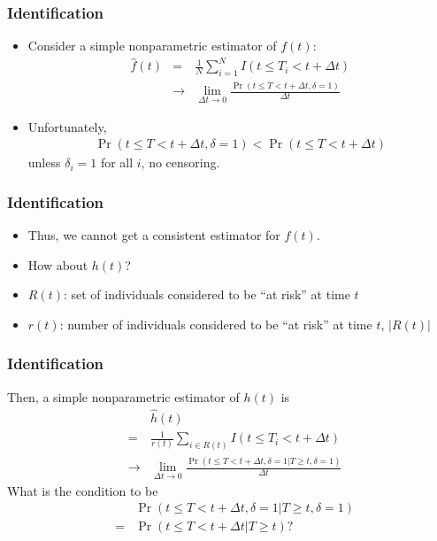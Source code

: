 \documentclass[14pt]{beamer}
\begin{document}
	\begin{frame}
	\frametitle{Identification}
	\begin{itemize}
	\item Consider a simple nonparametric estimator of $f(t)$:
	\begin{eqnarray*}
	\hat{f}(t) &=& \frac{1}{N} \sum_{i=1}^N I(t \leq T_i < t + \Delta t)\\
	&\to& \lim_{\Delta t \to 0}\frac{\Pr(t \leq T < t + \Delta t, \delta = 1)}{\Delta t}
	\end{eqnarray*}
	\item Unfortunately,
	\begin{eqnarray*}
	\Pr(t \leq T < t + \Delta t, \delta = 1) < \Pr(t \leq T < t + \Delta t)
	\end{eqnarray*}
	unless $\delta_i = 1$ for all $i$, no censoring.

	\end{itemize}
	\end{frame}

	\begin{frame}
	\frametitle{Identification}
	\begin{itemize}
	\item Thus, we cannot get a consistent estimator for $f(t)$.
	\item How about $h(t)$?
	\item $R(t)$: set of individuals considered to be ``at risk'' at time $t$
	\item $r(t)$: number of individuals considered to be ``at risk'' at time $t$, $|R(t)|$

	\end{itemize}
	\end{frame}

	\begin{frame}
	\frametitle{Identification}
	Then, a simple nonparametric estimator of $h(t)$ is
	\begin{eqnarray*}
	&\phantom{=}& \hat{h}(t)\\
	&=& \frac{1}{r(t)} \sum_{i \in R(t)} I(t \leq T_i < t + \Delta t)\\
	&\to& \lim_{\Delta t \to 0}\frac{\Pr(t \leq T < t + \Delta t, \delta = 1 | T \geq t, \delta = 1)}{\Delta t}
	\end{eqnarray*}
	What is the condition to be
	\begin{eqnarray*}
	&\phantom{=}& \Pr(t \leq T < t + \Delta t, \delta = 1 | T \geq t, \delta = 1)\\
	&=& \Pr(t \leq T < t + \Delta t | T \geq t)?
	\end{eqnarray*}

	\end{frame}
\end{document}
